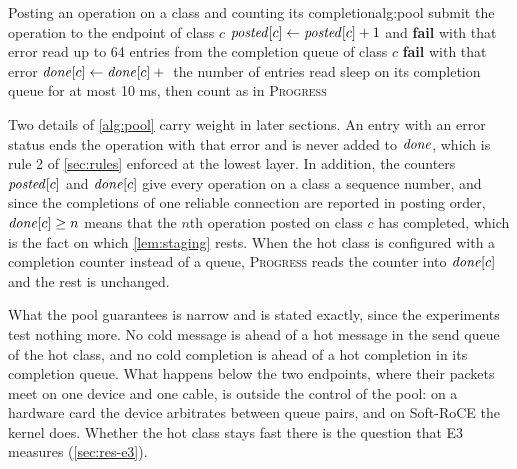\begin{pseudocode}{Posting an operation on a class and counting its completion}{alg:pool}
   
    \Loop
      \State submit the operation to the endpoint of class $c$ 
        \State $\mathit{posted}[c] \gets \mathit{posted}[c] + 1$ and \Return
        \State \textbf{fail} with that error
      \EndIf
      \State {} 
    \EndLoop
  \EndFunction
    \State read up to 64 entries from the completion queue of class $c$
      \State \textbf{fail} with that error 
    \EndIf
    \State $\mathit{done}[c] \gets \mathit{done}[c] +{}$ the number of entries read
  \EndFunction
   
       
        \State sleep on its completion queue for at most 10 ms, then count as in \textsc{Progress}
      \Else {}
        \State {}
      \EndIf
    \EndWhile
  \EndFunction
\end{pseudocode}

Two details of \cref{alg:pool} carry weight in later sections. An entry with
an error status ends the operation with that error and is never added to
$\mathit{done}$, which is rule 2 of \cref{sec:rules} enforced at the lowest
layer. In addition, the counters $\mathit{posted}[c]$ and $\mathit{done}[c]$ give
every operation on a class a sequence number, and since the completions of
one reliable connection are reported in posting order, $\mathit{done}[c] \ge n$
means that the $n$th operation posted on class $c$ has completed, which is
the fact on which \cref{lem:staging} rests. When the hot class is configured
with a completion counter instead of a queue, \textsc{Progress} reads the
counter into $\mathit{done}[c]$ and the rest is unchanged.

What the pool guarantees is narrow and is stated exactly, since the
experiments test nothing more. No cold message is ahead of a hot message in
the send queue of the hot class, and no cold completion is ahead of a hot
completion in its completion queue. What happens below the two endpoints,
where their packets meet on one device and one cable, is outside the control
of the pool: on a hardware card the device arbitrates between queue pairs,
and on Soft-RoCE the kernel does. Whether the hot class stays fast there is
the question that E3 measures (\cref{sec:res-e3}).

